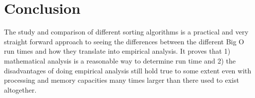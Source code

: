 \documentclass[journal]{IEEEtran}
\begin{document}
\section{Conclusion}
    The study and comparison of different sorting algorithms is a practical and very straight forward approach to seeing the differences between the different Big O run times and how they translate into empirical analysis. It proves that 1) mathematical analysis is a reasonable way to determine run time and 2) the disadvantages of doing empirical analysis still hold true to some extent even with processing and memory capacities many times larger than there used to exist altogether.
\end{document}
